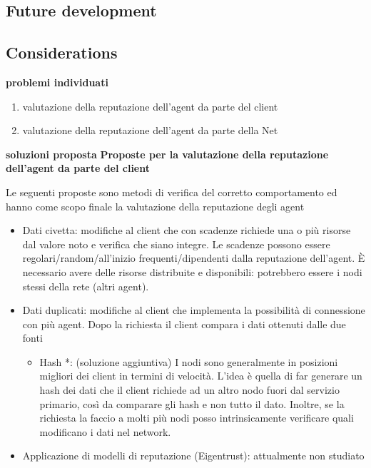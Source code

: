 \documentclass[]{article}
\begin{document}
	\subsection{Future development}
	\subsection{Considerations}

	\pagebreak

	\textbf{problemi individuati}
	\begin{enumerate}
		\item valutazione della reputazione dell'agent da parte del client
		\item valutazione della reputazione dell'agent da parte della Net
	\end{enumerate}
	
	\textbf{soluzioni proposta}
	\textbf{Proposte per la valutazione della reputazione dell'agent da parte del client}
	
	Le seguenti proposte sono metodi di verifica del corretto comportamento ed hanno come scopo finale la valutazione della reputazione degli agent
	\begin{itemize}
		\item Dati civetta: modifiche al client che con scadenze richiede una o più risorse dal valore noto e verifica che siano integre. Le scadenze possono essere regolari/random/all’inizio frequenti/dipendenti dalla reputazione dell’agent. È necessario avere delle risorse distribuite e disponibili: potrebbero essere i nodi stessi della rete (altri agent).
		\item Dati duplicati: modifiche al client che implementa la possibilità di connessione con più agent. Dopo la richiesta il client compara i dati ottenuti dalle due fonti
		\begin{itemize}
			\item Hash *: (soluzione aggiuntiva) I nodi sono generalmente in posizioni migliori dei client in termini di velocità. L’idea è quella di far generare un hash dei dati che il client richiede ad un altro nodo fuori dal servizio primario, così da comparare gli hash e non tutto il dato.
			Inoltre, se la richiesta la faccio a molti più nodi posso intrinsicamente verificare quali modificano i dati nel network.
		\end{itemize}
		\item Applicazione di modelli di reputazione (Eigentrust): attualmente non studiato
	\end{itemize}
	
	\pagebreak
	
	
\end{document}
